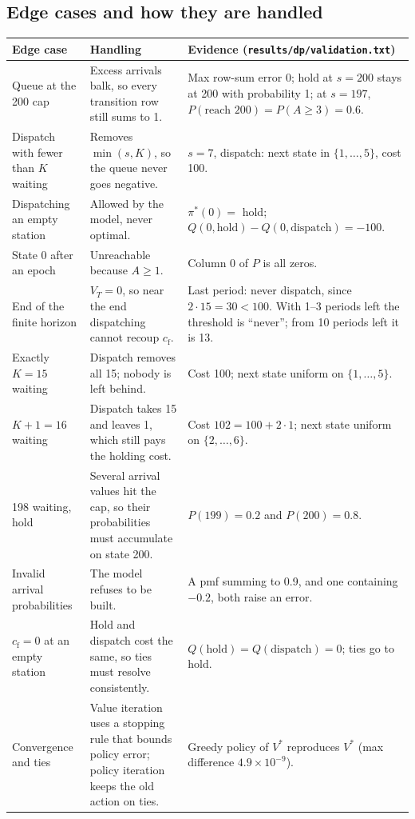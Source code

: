 \documentclass[10pt,a4paper]{article}
\newcommand{\code}[1]{\texttt{#1}}
\newcommand{\sci}[2]{$#1\times10^{#2}$}
\newcommand{\hd}[1]{\cellcolor{head}\textbf{#1}}
\newcommand{\cf}{c_{\mathrm f}}
\begin{document}
\subsection{Edge cases and how they are handled}
\begin{longtable}{@{}p{3.4cm}p{6.3cm}p{6.9cm}@{}}
\hline
\hd{Edge case} & \hd{Handling} & \hd{Evidence (\code{results/dp/validation.txt})} \\
\hline\endhead
Queue at the 200 cap & Excess arrivals balk, so every transition row still sums to 1. & Max row-sum error 0; hold at $s=200$ stays at 200 with probability 1; at $s=197$, $P(\text{reach }200)=P(A\ge3)=0.6$. \\
Dispatch with fewer than $K$ waiting & Removes $\min(s,K)$, so the queue never goes negative. & $s=7$, dispatch: next state in $\{1,\dots,5\}$, cost 100. \\
Dispatching an empty station & Allowed by the model, never optimal. & $\pi^*(0)=$ hold; $Q(0,\text{hold})-Q(0,\text{dispatch})=-100$. \\
State 0 after an epoch & Unreachable because $A\ge1$. & Column 0 of $P$ is all zeros. \\
End of the finite horizon & $V_T=0$, so near the end dispatching cannot recoup $\cf$. & Last period: never dispatch, since $2\cdot15=30<100$. With 1--3 periods left the threshold is ``never''; from 10 periods left it is 13. \\
Exactly $K=15$ waiting & Dispatch removes all 15; nobody is left behind. & Cost 100; next state uniform on $\{1,\dots,5\}$. \\
$K+1=16$ waiting & Dispatch takes 15 and leaves 1, which still pays the holding cost. & Cost $102=100+2\cdot1$; next state uniform on $\{2,\dots,6\}$. \\
198 waiting, hold & Several arrival values hit the cap, so their probabilities must accumulate on state 200. & $P(199)=0.2$ and $P(200)=0.8$. \\
Invalid arrival probabilities & The model refuses to be built. & A pmf summing to 0.9, and one containing $-0.2$, both raise an error. \\
$\cf=0$ at an empty station & Hold and dispatch cost the same, so ties must resolve consistently. & $Q(\text{hold})=Q(\text{dispatch})=0$; ties go to hold. \\
Convergence and ties & Value iteration uses a stopping rule that bounds policy error; policy iteration keeps the old action on ties. & Greedy policy of $V^*$ reproduces $V^*$ (max difference \sci{4.9}{-9}). \\
\hline
\end{longtable}
\end{document}
